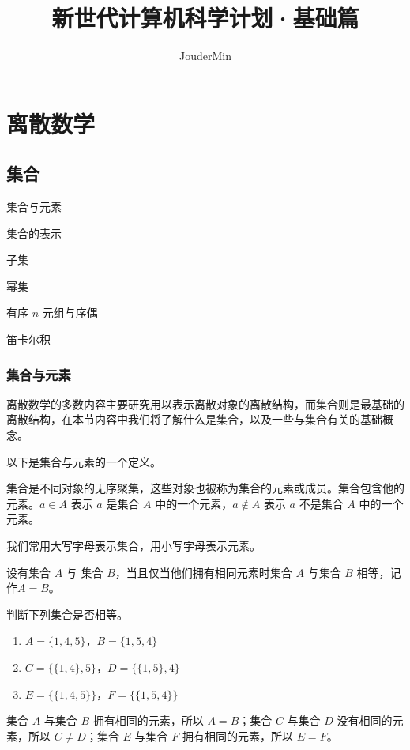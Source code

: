 \documentclass[lang=cn, chinesefont=founder, color=cyan, citestyle=gb7714-2015, bibstyle=gb7714-2015]{elegantbook}
\title{新世代计算机科学计划·基础篇}
\author{JouderMin}
\institute{「新世代计算机科学计划」制作委员会}
\date{\zhtoday}
\begin{document}
\maketitle
\frontmatter

\tableofcontents

\mainmatter

\chapter{离散数学}
\section{集合}
\begin{introduction}
    \item 集合与元素
    \item 集合的表示
    \item 子集
    \item 幂集
    \item 有序 $n$ 元组与序偶
    \item 笛卡尔积
\end{introduction}

\subsection{集合与元素}
离散数学的多数内容主要研究用以表示离散对象的离散结构，而集合则是最基础的离散结构，在本节内容中我们将了解什么是集合，以及一些与集合有关的基础概念。

以下是集合与元素的一个定义。
\begin{definition}[集合与元素]\label{def:集合与元素}
    集合是不同对象的无序聚集，这些对象也被称为集合的元素或成员。集合包含他的元素。$a \in A$ 表示 $a$ 是集合 $A$ 中的一个元素，$a \notin A$ 表示 $a$ 不是集合 $A$ 中的一个元素。
\end{definition}

我们常用大写字母表示集合，用小写字母表示元素。
\begin{definition}[相等的集合]\label{def:相等的集合}
    设有集合 $A$ 与 集合 $B$，当且仅当他们拥有相同元素时集合 $A$ 与集合 $B$ 相等，记作$A = B$。
\end{definition}

\begin{collections}
    \begin{example}
        判断下列集合是否相等。
        \begin{enumerate}
            \item $A = \{ 1, 4, 5 \}$，$B = \{ 1, 5 ,4 \}$
            \item $C = \{ \{ 1, 4 \}, 5 \}$，$D = \{ \{ 1, 5 \}, 4 \}$
            \item $E = \{ \{ 1, 4, 5 \} \}$，$F = \{ \{ 1, 5, 4 \} \}$
        \end{enumerate}
    \end{example}
    \begin{solution}
        集合 $A$ 与集合 $B$ 拥有相同的元素，所以 $A = B$；集合 $C$ 与集合 $D$ 没有相同的元素，所以 $C \neq D$；集合 $E$ 与集合 $F$ 拥有相同的元素，所以 $E = F$。
    \end{solution}
\end{collections}
\end{document}

